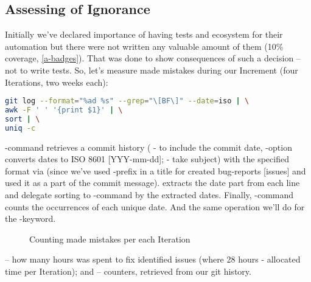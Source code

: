 \subsection{Assessing of Ignorance} \label{ut-fail}

Initially we've declared importance of having tests and ecosystem for their automation but there were not written any 
valuable amount of them (10\% coverage, \ref{a-badges}). That was done to show consequences of such a decision -- not 
to write tests. So, let's measure made mistakes during our Increment (four Iterations, two weeks each):

\begin{lstlisting}[language=bash]
git log --format="%ad %s" --grep="\[BF\]" --date=iso | \
awk -F ' ' '{print $1}' | \
sort | \
uniq -c
\end{lstlisting}

\noindent {}-command retrieves a commit history ( - to include the commit date, -option 
converts dates to ISO 8601 [YYY-mm-dd];  - take subject) with the specified format via  (since we've 
used \q{[BF]}-prefix in a title for created bug-reports [issues] and used it as a part of the commit message). \q{awk} 
extracts the date part from each line and delegate sorting to \q{sort}-command by the extracted dates. Finally, 
\q{uniq -c}-command counts the occurrences of each unique date. And the same operation we'll do for the \q{fix}-keyword.

\begin{figure}[h]
  \begin{center}
  \end{center}
  \caption{Counting made mistakes per each Iteration}\label{im-errors}
\end{figure}

\noindent {} -- how many hours was spent to fix identified issues (where 28 hours - allocated time per Iteration);
 and  -- counters, retrieved from our git history.\\
\\


